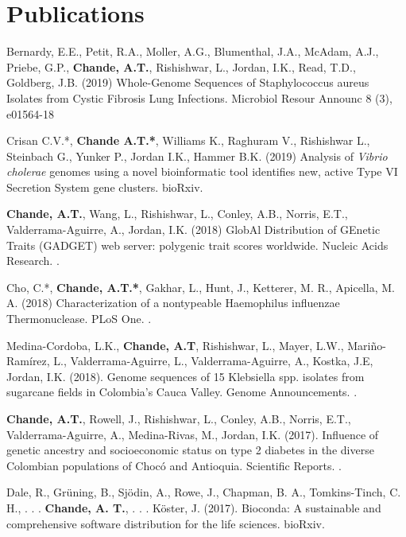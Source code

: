 \documentclass[11pt,letterpaper,sans]{moderncv} %
\begin{document}
\section{Publications}

\begin{etaremune}
\item Bernardy, E.E., Petit, R.A., Moller, A.G., Blumenthal, J.A., McAdam, A.J., Priebe, G.P., \textbf{Chande, A.T.}, Rishishwar, L., Jordan, I.K., Read, T.D.,  Goldberg, J.B. (2019) Whole-Genome Sequences of Staphylococcus aureus Isolates from Cystic Fibrosis Lung Infections. Microbiol Resour Announc 8 (3), e01564-18  
\item Crisan C.V.*, \textbf{Chande A.T.*}, Williams K., Raghuram V., Rishishwar L., Steinbach G., Yunker P., Jordan I.K., Hammer B.K. (2019) Analysis of \textit{Vibrio cholerae} genomes using a novel bioinformatic tool identifies new, active Type VI Secretion System gene clusters. bioRxiv. 
\item \textbf{Chande, A.T.}, Wang, L., Rishishwar, L., Conley, A.B., Norris, E.T., Valderrama-Aguirre, A., Jordan, I.K. (2018) GlobAl Distribution of GEnetic Traits (GADGET) web server: polygenic trait scores worldwide. Nucleic Acids Research. . 
\item Cho, C.*, \textbf{Chande, A.T.*}, Gakhar, L., Hunt, J., Ketterer, M. R., Apicella, M. A. (2018) Characterization of a nontypeable Haemophilus influenzae Thermonuclease. PLoS One. . 
\item Medina-Cordoba, L.K., \textbf{Chande, A.T}, Rishishwar, L., Mayer, L.W., Mari{\~{n}}o-Ram{{\'i}}rez, L., Valderrama-Aguirre, L., Valderrama-Aguirre, A., Kostka, J.E, Jordan, I.K. (2018). Genome sequences of 15 Klebsiella spp. isolates from sugarcane fields in Colombia's Cauca Valley. Genome Announcements. . 
\item \textbf{Chande, A.T.}, Rowell, J., Rishishwar, L., Conley, A.B., Norris, E.T., Valderrama-Aguirre, A., Medina-Rivas, M., Jordan, I.K. (2017). Influence of genetic ancestry and socioeconomic status on type 2 diabetes in the diverse Colombian populations of Chocó and Antioquia. Scientific Reports. . 
\item Dale, R., Gr{\"u}ning, B., Sj{\"o}din, A., Rowe, J., Chapman, B. A., Tomkins-Tinch, C. H., . . . \textbf{Chande, A. T.}, . . . K{\"o}ster, J. (2017). Bioconda: A sustainable and comprehensive software distribution for the life sciences. bioRxiv. 

\end{etaremune}
\end{document}
